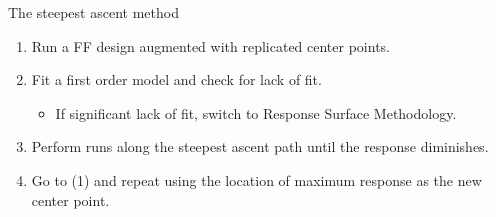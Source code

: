 \documentclass[10pt]{beamer}\usepackage[]{graphicx}\usepackage[]{color}
\begin{document}
\begin{frame}{The steepest ascent method}

\begin{enumerate}
  \item<1-> Run a FF design augmented with replicated center points.
  \item<2-> Fit a first order model and check for lack of fit.
    \begin{itemize}
      \item If significant lack of fit, switch to Response Surface Methodology.
    \end{itemize}
  \item<3-> Perform runs along the steepest ascent path until the response diminishes.
  \item<4-> Go to (1) and repeat using the location of maximum response as the new center point.
\end{enumerate}

\end{frame}
\end{document}

